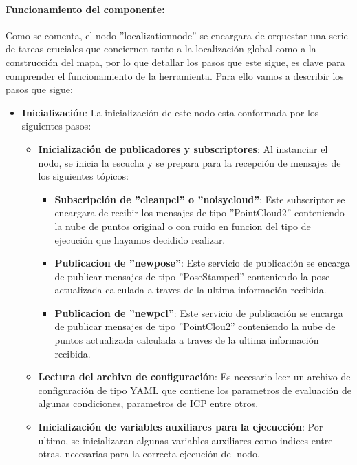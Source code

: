 \documentclass[12pt, a4paper, twoside]{article}
\begin{document}
\paragraph{Funcionamiento del componente:}
Como se comenta, el nodo ''localization\textunderscore node'' se encargara de orquestar una serie de tareas cruciales que conciernen tanto a la localización 
global como a la construcción del mapa, por lo que detallar los pasos que este sigue, es clave para comprender el funcionamiento de la herramienta. Para ello 
vamos a describir los pasos que sigue:
\begin{itemize}
  \item \textbf{Inicialización}: La inicialización de este nodo esta conformada por los siguientes pasos:
  \begin{itemize}
    \item \textbf{Inicialización de publicadores y subscriptores}: Al instanciar el nodo, se inicia la escucha y se prepara para la recepción de mensajes de los 
    siguientes tópicos:
    \begin{itemize}
      \item \textbf{Subscripción de ''clean\textunderscore pcl'' o ''noisy\textunderscore cloud''}: Este subscriptor se encargara de recibir los mensajes de tipo 
      ''PointCloud2'' conteniendo la nube de puntos original o con ruido en funcion del tipo de ejecución que hayamos decidido realizar.
      \item \textbf{Publicacion de ''new\textunderscore pose''}: Este servicio de publicación se encarga de publicar mensajes de tipo ''PoseStamped'' conteniendo 
      la pose actualizada calculada a traves de la ultima información recibida.
      \item \textbf{Publicacion de ''new\textunderscore pcl''}: Este servicio de publicación se encarga de publicar mensajes de tipo ''PointClou2'' conteniendo 
      la nube de puntos actualizada calculada a traves de la ultima información recibida.
    \end{itemize}
    \item \textbf{Lectura del archivo de configuración}: Es necesario leer un archivo de configuración de tipo YAML que contiene los parametros de evaluación de 
    algunas condiciones, parametros de ICP entre otros.
    \item \textbf{Inicialización de variables auxiliares para la ejecucción}: Por ultimo, se inicializaran algunas variables auxiliares como indices entre otras, necesarias 
    para la correcta ejecución del nodo.
  \end{itemize}

\end{itemize}
\end{document}
